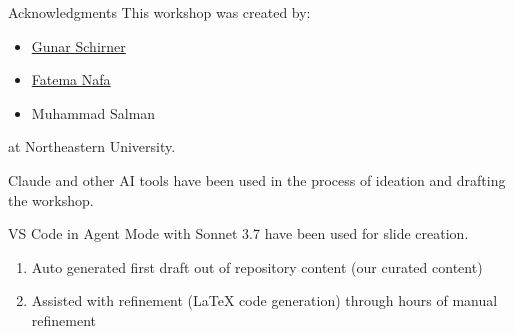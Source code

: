 \documentclass[xcolor={dvipsnames,table}, aspectratio=169]{beamer}
\begin{document}
\begin{frame}{Acknowledgments}
  This workshop was created by:
  \begin{itemize}
    \item \href{https://coe.northeastern.edu/people/schirner-gunar/}{Gunar Schirner}
    \item \href{https://coe.northeastern.edu/people/nafa-fatema/}{Fatema Nafa}
    \item Muhammad Salman
  \end{itemize}
  
  at Northeastern University.
  
  \vspace{1em}
  
  Claude and other AI tools have been used in the process of ideation and drafting the workshop.

  VS Code in Agent Mode with Sonnet 3.7 have been used for slide creation.
  \begin{enumerate}
    \item Auto generated first draft out of repository content (our curated content)  
    \item Assisted with refinement (LaTeX code generation) through hours of manual refinement
  \end{enumerate}
\end{frame}
\end{document}
